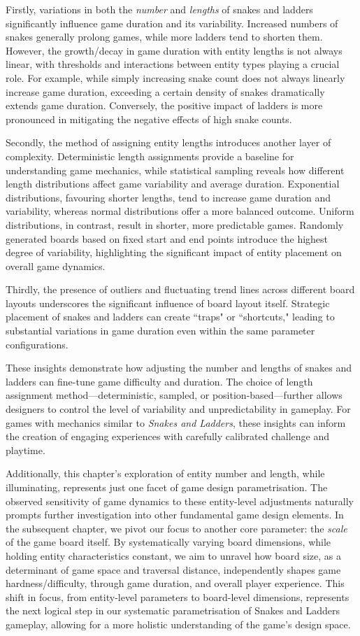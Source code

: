 Firstly, variations in both the \textit{number} and \textit{lengths} of snakes and ladders significantly influence game duration and its variability. Increased numbers of snakes generally prolong games, while more ladders tend to shorten them. However, the growth/decay in game duration with entity lengths is not always linear, with thresholds and interactions between entity types playing a crucial role. For example, while simply increasing snake count does not always linearly increase game duration, exceeding a certain density of snakes dramatically extends game duration. Conversely, the positive impact of ladders is more pronounced in mitigating the negative effects of high snake counts.

Secondly, the method of assigning entity lengths introduces another layer of complexity. Deterministic length assignments provide a baseline for understanding game mechanics, while statistical sampling reveals how different length distributions affect game variability and average duration. Exponential distributions, favouring shorter lengths, tend to increase game duration and variability, whereas normal distributions offer a more balanced outcome. Uniform distributions, in contrast, result in shorter, more predictable games. Randomly generated boards based on fixed start and end points introduce the highest degree of variability, highlighting the significant impact of entity placement on overall game dynamics.

Thirdly, the presence of outliers and fluctuating trend lines across different board layouts underscores the significant influence of board layout itself. Strategic placement of snakes and ladders can create ``traps" or ``shortcuts," leading to substantial variations in game duration even within the same parameter configurations.

These insights demonstrate how adjusting the number and lengths of snakes and ladders can fine-tune game difficulty and duration. The choice of length assignment method—deterministic, sampled, or position-based—further allows designers to control the level of variability and unpredictability in gameplay. For games with mechanics similar to \textit{Snakes and Ladders}, these insights can inform the creation of engaging experiences with carefully calibrated challenge and playtime.

Additionally, this chapter's exploration of entity number and length, while illuminating, represents just one facet of game design parametrisation. The observed sensitivity of game dynamics to these entity-level adjustments naturally prompts further investigation into other fundamental game design elements. In the subsequent chapter, we pivot our focus to another core parameter: the \textit{scale} of the game board itself. By systematically varying board dimensions, while holding entity characteristics constant, we aim to unravel how board size, as a determinant of game space and traversal distance, independently shapes game hardness/difficulty, through game duration, and overall player experience. This shift in focus, from entity-level parameters to board-level dimensions, represents the next logical step in our systematic parametrisation of Snakes and Ladders gameplay, allowing for a more holistic understanding of the game's design space.
